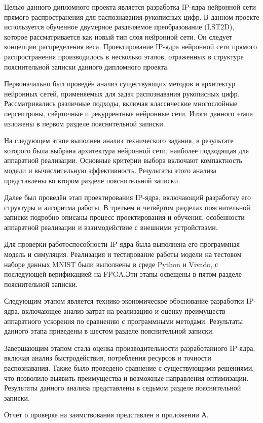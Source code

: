 Целью данного дипломного проекта является разработка IP-ядра нейронной сети 
прямого распространения для распознавания рукописных цифр. В данном проекте 
используется обученное двумерное разделяемое преобразование (LST2D), которое 
рассматривается как новый тип слоя нейронной сети. Он следует концепции 
распределения веса. Проектирование IP-ядра нейронной сети прямого 
распространения производилось в несколько этапов, отраженных в структуре 
пояснительной записки данного дипломного проекта.

Первоначально был проведён анализ существующих методов и архитектур нейронных 
сетей, применяемых для задач распознавания рукописных цифр. Рассматривались 
различные подходы, включая классические многослойные персептроны, свёрточные 
и рекуррентные нейронные сети. Итоги данного этапа изложены в первом разделе 
пояснительной записки.

На следующем этапе выполнен анализ технического задания, в результате которого 
была выбрана архитектура нейронной сети, наиболее подходящая для аппаратной 
реализации. Основные критерии выбора включают компактность модели и 
вычислительную эффективность. Результаты этого анализа представлены во втором 
разделе пояснительной записки.

Далее был проведён этап проектирования IP-ядра, включающий разработку его 
структуры и алгоритма работы. В третьем и четвёртом разделах пояснительной 
записки подробно описаны процесс проектирования и обучения, особенности 
аппаратной реализации и взаимодействие с внешними устройствами.

Для проверки работоспособности IP-ядра была выполнена его программная модель и 
симуляция. Реализация и тестирование работы модели на тестовом наборе данных 
MNIST были выполнены в среде Python и Vivado, с последующей верификацией на 
FPGA.\@ Эти этапы освещены в пятом разделе пояснительной записки.

Следующим этапом является технико-экономическое обоснование разработки IP-ядра, 
включающее анализ затрат на реализацию и оценку преимуществ аппаратного 
ускорения по сравнению с программными методами. Результаты данного этапа 
приведены в шестом разделе пояснительной записки.

Завершающим этапом стала оценка производительности разработанного IP-ядра, 
включая анализ быстродействия, потребления ресурсов и точности распознавания. 
Также было проведено сравнение с существующими решениями, что позволило выявить 
преимущества и возможные направления оптимизации. Результаты данного анализа 
представлены в седьмом разделе пояснительной записки.

Отчет о проверке на заимствования представлен в приложении А.